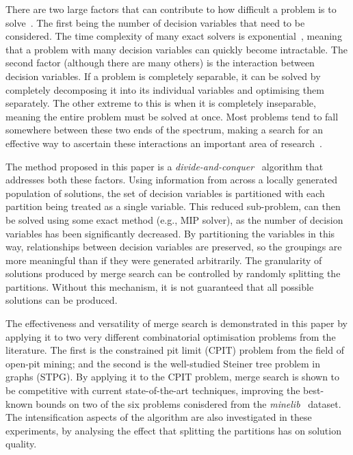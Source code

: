 \documentclass[journal]{IEEEtran}
\begin{document}
There are two large factors that can contribute to how difficult a problem is to solve~\cite{int_and_cop}. The first being the number of decision variables that need to be considered. The time complexity of many exact solvers is exponential~\cite{convex}, meaning that a problem with many decision variables can quickly become intractable. 
The second factor (although there are many others) is the interaction between decision variables. If a problem is completely separable, it can be solved by completely decomposing it into its individual variables and optimising them separately. The other extreme to this is when it is completely inseparable, meaning the entire problem must be solved at once. Most problems tend to fall somewhere between these two ends of the spectrum, making a search for an effective way to ascertain these interactions an important area of research~\cite{decomp,omidvar}.

The method proposed in this paper is a \emph{divide-and-conquer}~\cite{alg:levitin} algorithm that addresses both these factors. Using information from across a locally generated population of solutions, the set of decision variables is partitioned with each partition being treated as a single variable. This reduced sub-problem, can then be solved using some exact method (e.g., MIP solver), as the number of decision variables has been significantly decreased. By partitioning the variables in this way, relationships between decision variables are preserved, so the groupings are more meaningful than if they were generated arbitrarily. The granularity of solutions produced by merge search can be controlled by randomly splitting the partitions. Without this mechanism, it is not guaranteed that all possible solutions can be produced.

The effectiveness and versatility of merge search is demonstrated in this paper by applying it to two very different combinatorial optimisation problems from the literature. The first is the constrained pit limit (CPIT) problem from the field of open-pit mining; and the second is the well-studied Steiner tree problem in graphs (STPG). By applying it to the CPIT problem, merge search is shown to be competitive with current state-of-the-art techniques, improving the best-known bounds on two of the six problems conisdered from the \emph{minelib}~\cite{minelib} dataset. The intensification aspects of the algorithm are also investigated in these experiments, by analysing the effect that splitting the partitions has on solution quality.
\end{document}
